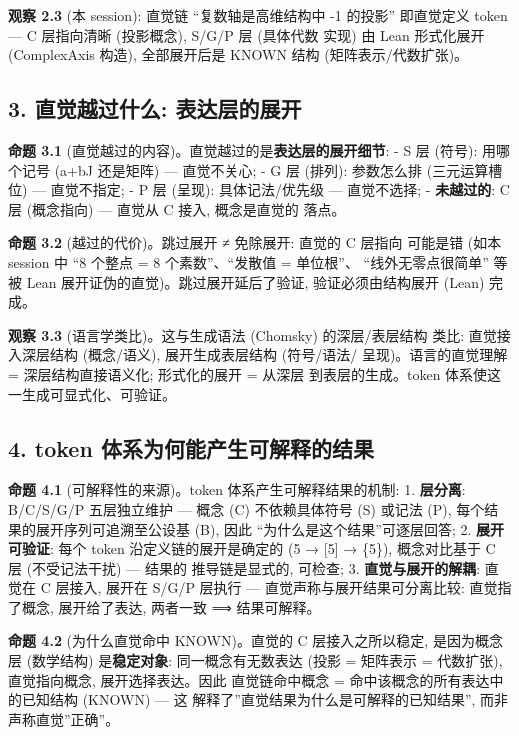 \documentclass[
]{article}
\begin{document}
\textbf{观察 2.3} (本 session): 直觉链 ``复数轴是高维结构中 -1 的投影''
即直觉定义 token --- C 层指向清晰 (投影概念), S/G/P 层 (具体代数 实现)
由 Lean 形式化展开 (ComplexAxis 构造), 全部展开后是 KNOWN 结构
(矩阵表示/代数扩张)。

\subsection{3. 直觉越过什么:
表达层的展开}\label{ux76f4ux89c9ux8d8aux8fc7ux4ec0ux4e48-ux8868ux8fbeux5c42ux7684ux5c55ux5f00}

\textbf{命题 3.1}
(直觉越过的内容)。直觉越过的是\textbf{表达层的展开细节}: - S 层 (符号):
用哪个记号 (a+bJ 还是矩阵) --- 直觉不关心; - G 层 (排列): 参数怎么排
(三元运算槽位) --- 直觉不指定; - P 层 (呈现): 具体记法/优先级 ---
直觉不选择; - \textbf{未越过的}: C 层 (概念指向) --- 直觉从 C 接入,
概念是直觉的 落点。

\textbf{命题 3.2} (越过的代价)。跳过展开 ≠ 免除展开: 直觉的 C 层指向
可能是错 (如本 session 中 ``8 个整点 = 8 个素数''、``发散值 = 单位根''、
``线外无零点很简单'' 等被 Lean 展开证伪的直觉)。跳过展开延后了验证,
验证必须由结构展开 (Lean) 完成。

\textbf{观察 3.3} (语言学类比)。这与生成语法 (Chomsky) 的深层/表层结构
类比: 直觉接入深层结构 (概念/语义), 展开生成表层结构 (符号/语法/
呈现)。语言的直觉理解 = 深层结构直接语义化; 形式化的展开 = 从深层
到表层的生成。token 体系使这一生成可显式化、可验证。

\subsection{4. token
体系为何能产生可解释的结果}\label{token-ux4f53ux7cfbux4e3aux4f55ux80fdux4ea7ux751fux53efux89e3ux91caux7684ux7ed3ux679c}

\textbf{命题 4.1} (可解释性的来源)。token 体系产生可解释结果的机制: 1.
\textbf{层分离}: B/C/S/G/P 五层独立维护 --- 概念 (C) 不依赖具体符号 (S)
或记法 (P), 每个结果的展开序列可追溯至公设基 (B), 因此
``为什么是这个结果''可逐层回答; 2. \textbf{展开可验证}: 每个 token
沿定义链的展开是确定的 (5 → {[}5{]} → \{5\}), 概念对比基于 C 层
(不受记法干扰) --- 结果的 推导链是显式的, 可检查; 3.
\textbf{直觉与展开的解耦}: 直觉在 C 层接入, 展开在 S/G/P 层执行 ---
直觉声称与展开结果可分离比较: 直觉指了概念, 展开给了表达, 两者一致 ⟹
结果可解释。

\textbf{命题 4.2} (为什么直觉命中 KNOWN)。直觉的 C 层接入之所以稳定,
是因为概念层 (数学结构) 是\textbf{稳定对象}: 同一概念有无数表达 (投影 =
矩阵表示 = 代数扩张), 直觉指向概念, 展开选择表达。因此 直觉链命中概念 =
命中该概念的所有表达中的已知结构 (KNOWN) --- 这
解释了''直觉结果为什么是可解释的已知结果'', 而非声称直觉''正确''。
\end{document}
